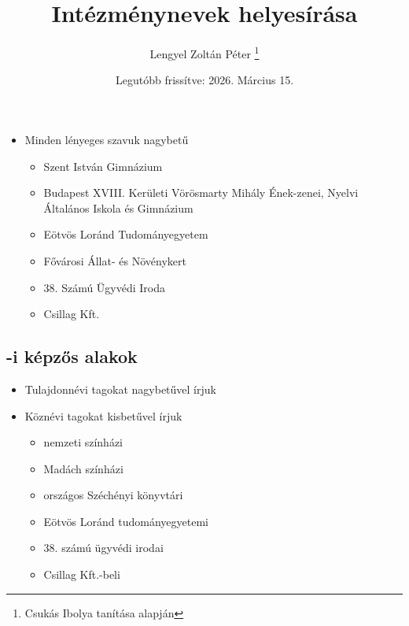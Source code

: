 \documentclass{article}
\title{Intézménynevek helyesírása}
\author{Lengyel Zoltán Péter \thanks{Csukás Ibolya tanítása alapján}}
\date{Legutóbb frissítve: 2026. Március 15.}
\begin{document}
\maketitle

\begin{itemize}
    \item Minden lényeges szavuk nagybetű
    \begin{itemize}
        \item Szent István Gimnázium
        \item Budapest XVIII. Kerületi Vörösmarty Mihály Ének-zenei, Nyelvi Általános Iskola és Gimnázium
        \item Eötvös Loránd Tudományegyetem
        \item Fővárosi Állat- és Növénykert
        \item 38. Számú Ügyvédi Iroda
        \item Csillag Kft.
    \end{itemize}
\end{itemize}
\subsection{-i képzős alakok}
\begin{itemize}
    \item Tulajdonnévi tagokat nagybetűvel írjuk
    \item Köznévi tagokat kisbetűvel írjuk
    \begin{itemize}
        \item nemzeti színházi
        \item Madách színházi
        \item országos Széchényi könyvtári
        \item Eötvös Loránd tudományegyetemi
        \item 38. számú ügyvédi irodai
        \item Csillag Kft.-beli
    \end{itemize}
\end{itemize}
\end{document}
